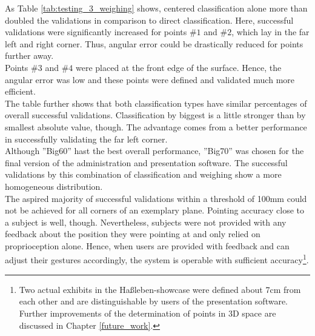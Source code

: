 As Table \ref{tab:testing_3_weighing} shows, centered classification alone more than doubled the validations in comparison to direct classification. Here, successful validations were significantly increased for points $\#1$ and $\#2$, which lay in the far left and right corner. Thus, angular error could be drastically reduced for points further away.
\\
Points $\#3$ and $\#4$ were placed at the front edge of the surface. Hence, the angular error was low and these points were defined and validated much more efficient.
\\
The table further shows that both classification types have similar percentages of overall successful validations. Classification by biggest is a little stronger than by smallest absolute value, though. The advantage comes from a better performance in successfully validating the far left corner.
\\
Although ''Big60'' hast the best overall performance, ''Big70'' was chosen for the final version of the administration and presentation software. The successful validations by this combination of classification and weighing show a more homogeneous distribution. 
\\
The aspired majority of successful validations within a threshold of 100mm could not be achieved for all corners of an exemplary plane. Pointing accuracy close to a subject is well, though. Nevertheless, subjects were not provided with any feedback about the position they were pointing at and only relied on proprioception alone. Hence, when users are provided with feedback and can adjust their gestures accordingly, the system is operable with sufficient accuracy\footnote{Two actual exhibits in the Haßleben-showcase were defined about 7cm from each other and are distinguishable by users of the presentation software. Further improvements of the determination of points in \ac{3D} space are discussed in Chapter \ref{future_work}.}. 

